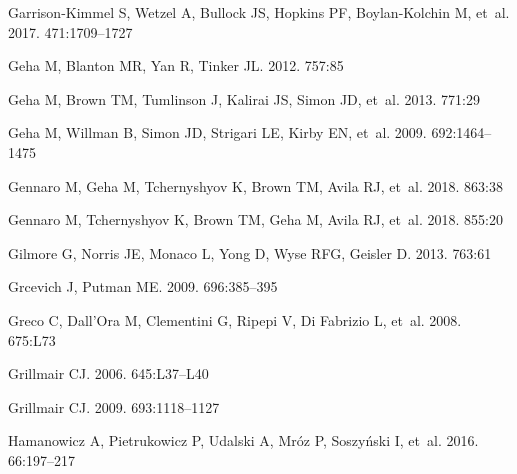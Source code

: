\documentclass[a4paper]{ar-1col}
\begin{document}
\begin{thebibliography}{}
{Garrison-Kimmel} S, {Wetzel} A, {Bullock} JS, {Hopkins} PF, {Boylan-Kolchin}
  M, et~al. 2017.
\textit{\mnras} 471:1709--1727

{Geha} M, {Blanton} MR, {Yan} R, {Tinker} JL. 2012.
\textit{\apj} 757:85

{Geha} M, {Brown} TM, {Tumlinson} J, {Kalirai} JS, {Simon} JD, et~al. 2013.
\textit{\apj} 771:29

{Geha} M, {Willman} B, {Simon} JD, {Strigari} LE, {Kirby} EN, et~al. 2009.
\textit{\apj} 692:1464--1475

{Gennaro} M, {Geha} M, {Tchernyshyov} K, {Brown} TM, {Avila} RJ, et~al.
  2018{}.
\textit{\apj} 863:38

{Gennaro} M, {Tchernyshyov} K, {Brown} TM, {Geha} M, {Avila} RJ, et~al.
  2018{}.
\textit{\apj} 855:20

{Gilmore} G, {Norris} JE, {Monaco} L, {Yong} D, {Wyse} RFG, {Geisler} D. 2013.
\textit{\apj} 763:61

{Grcevich} J, {Putman} ME. 2009.
\textit{\apj} 696:385--395

{Greco} C, {Dall'Ora} M, {Clementini} G, {Ripepi} V, {Di Fabrizio} L, et~al.
  2008.
\textit{\apjl} 675:L73

{Grillmair} CJ. 2006.
\textit{\apjl} 645:L37--L40

{Grillmair} CJ. 2009.
\textit{\apj} 693:1118--1127

{Hamanowicz} A, {Pietrukowicz} P, {Udalski} A, {Mr{\'o}z} P, {Soszy{\'n}ski} I,
  et~al. 2016.
\textit{\actaa} 66:197--217


\end{thebibliography}
\end{document}
